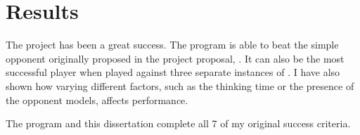 \section{Results}								%


The project has been a great success.
The program is able to beat the simple opponent originally proposed in the project proposal, \sbt. It can also be the most successful player when played against three separate instances of \sbt. I have also shown how varying different factors, such as the thinking time or the presence of the opponent models, affects performance.

The program and this dissertation complete all 7 of my original success criteria. 






